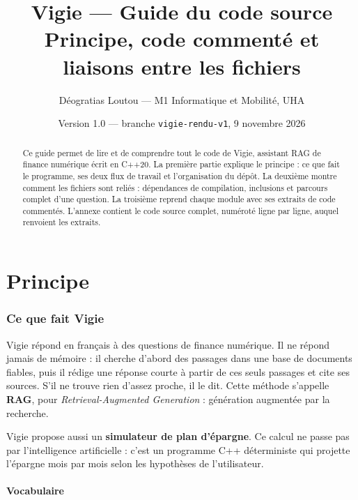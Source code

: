 \documentclass[11pt,a4paper]{article}
\title{\textbf{Vigie} --- Guide du code source\\[4pt]
\large Principe, code commenté et liaisons entre les fichiers}
\author{Déogratias Loutou --- M1 Informatique et Mobilité, UHA}
\date{Version 1.0 --- branche \texttt{vigie-rendu-v1}, 9 novembre 2026}
\begin{document}
\maketitle

\begin{abstract}
Ce guide permet de lire et de comprendre tout le code de Vigie, assistant RAG de finance numérique écrit en C++20. La première partie explique le principe : ce que fait le programme, ses deux flux de travail et l'organisation du dépôt. La deuxième montre comment les fichiers sont reliés : dépendances de compilation, inclusions et parcours complet d'une question. La troisième reprend chaque module avec ses extraits de code commentés. L'annexe contient le code source complet, numéroté ligne par ligne, auquel renvoient les extraits.
\end{abstract}

\tableofcontents
\newpage

\part{Principe}

\section{Ce que fait Vigie}

Vigie répond en français à des questions de finance numérique. Il ne répond jamais de mémoire : il cherche d'abord des passages dans une base de documents fiables, puis il rédige une réponse courte à partir de ces seuls passages et cite ses sources. S'il ne trouve rien d'assez proche, il le dit. Cette méthode s'appelle \textbf{RAG}, pour \emph{Retrieval-Augmented Generation} : génération augmentée par la recherche.

Vigie propose aussi un \textbf{simulateur de plan d'épargne}. Ce calcul ne passe pas par l'intelligence artificielle : c'est un programme C++ déterministe qui projette l'épargne mois par mois selon les hypothèses de l'utilisateur.

\subsection{Vocabulaire}
\end{document}
